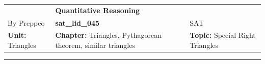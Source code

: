 \documentclass[11pt,paper=a4,answers]{exam}
\begin{document}
\begin{center}
    \centering
    \renewcommand{\arraystretch}{1.5}
    \begin{tabularx}{\textwidth}{YYY}
    & \normalsize\bf{{\Large{{Quantitative Reasoning}}}} & \\
    By Preppeo & \normalsize\bf{{sat\_lid\_045}} & SAT\\
    \normalsize{{\textbf{{Unit:}} Triangles}} & \normalsize{{\textbf{{Chapter:}} Triangles, Pythagorean theorem, similar triangles}} & \normalsize{{\textbf{{Topic:}} Special Right Triangles}} \\
    \end{tabularx}
\end{center}
\par\noindent\rule{\textwidth}{1pt}
\end{document}
